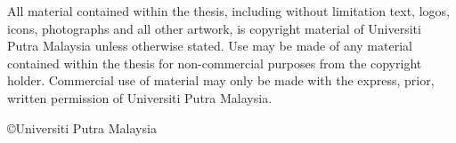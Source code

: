 \thispagestyle{empty}
All material contained within the thesis, including without limitation text, logos, icons, photographs and all other artwork, is copyright material of Universiti Putra Malaysia unless otherwise stated. Use may be made of any material contained within the thesis for non-commercial purposes from the copyright holder. Commercial use of material may only be made with the express, prior, written permission of Universiti Putra Malaysia.
    
\copyright{Universiti Putra Malaysia}